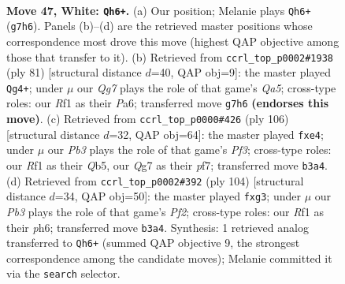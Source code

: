 \documentclass[11pt]{article}
\begin{document}
\clearpage

\begin{figure}[p]\centering
\begin{subfigure}{0.46\textwidth}\centering
\resizebox{\linewidth}{!}{%
\newchessgame
\chessboard[
  setfen={8/6Q1/2k5/1qp5/p7/1P6/P7/5RK1 w - - 3 47},
  showmover=false,
  pgfstyle=straightmove, color=movearrow, markmove={g7-h6}
]}
\caption{}
\end{subfigure}\hfill
\begin{subfigure}{0.46\textwidth}\centering
\resizebox{\linewidth}{!}{%
\newchessgame
\chessboard[
  setfen={k7/1p6/p7/2p2P2/q7/3QP3/4K3/8 b - - 0 41},
  showmover=false,
  pgfstyle=straightmove, color=movearrow, markmove={a4-g4}
]}
\caption{}
\end{subfigure}
\\[4pt]
\begin{subfigure}{0.46\textwidth}\centering
\resizebox{\linewidth}{!}{%
\newchessgame
\chessboard[
  setfen={8/5p1k/P6p/1Q6/4pq2/5P2/4K3/8 w - - 0 54},
  showmover=false,
  pgfstyle=straightmove, color=movearrow, markmove={f3-e4}
]}
\caption{}
\end{subfigure}\hfill
\begin{subfigure}{0.46\textwidth}\centering
\resizebox{\linewidth}{!}{%
\newchessgame
\chessboard[
  setfen={8/4Q3/7p/5q1k/4p3/4P1p1/5P2/6K1 w - - 0 53},
  showmover=false,
  pgfstyle=straightmove, color=movearrow, markmove={f2-g3}
]}
\caption{}
\end{subfigure}
\caption{\textbf{Move 47, White: \texttt{Qh6+}.} (a) Our position; Melanie plays \texttt{Qh6+} (\texttt{g7h6}). Panels (b)--(d) are the retrieved master positions whose correspondence most drove this move (highest QAP objective among those that transfer to it). (b) Retrieved from \texttt{ccrl\_top\_p0002\#1938} (ply 81) [structural distance $d$=40, QAP obj=9]: the master played \texttt{Qg4+}; under $\mu$ our \emph{Qg7} plays the role of that game's \emph{Qa5}; cross-type roles: our \emph{R}f1 as their \emph{P}a6; transferred move \texttt{g7h6} \textbf{(endorses this move)}. (c) Retrieved from \texttt{ccrl\_top\_p0000\#426} (ply 106) [structural distance $d$=32, QAP obj=64]: the master played \texttt{fxe4}; under $\mu$ our \emph{Pb3} plays the role of that game's \emph{Pf3}; cross-type roles: our \emph{R}f1 as their \emph{Q}b5, our \emph{Q}g7 as their \emph{p}f7; transferred move \texttt{b3a4}. (d) Retrieved from \texttt{ccrl\_top\_p0002\#392} (ply 104) [structural distance $d$=34, QAP obj=50]: the master played \texttt{fxg3}; under $\mu$ our \emph{Pb3} plays the role of that game's \emph{Pf2}; cross-type roles: our \emph{R}f1 as their \emph{p}h6; transferred move \texttt{b3a4}. Synthesis: 1 retrieved analog transferred to \texttt{Qh6+} (summed QAP objective 9, the strongest correspondence among the candidate moves); Melanie committed it via the \texttt{search} selector.}
\label{fig:thought-m92}
\end{figure}
\end{document}

